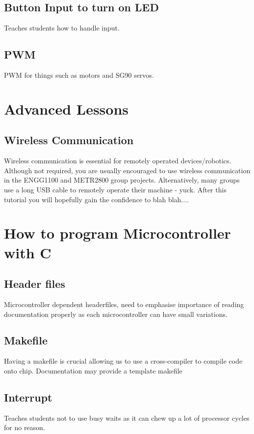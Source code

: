 \documentclass[11pt]{article}
\begin{document}
\subsection*{Button Input to turn on LED}
Teaches students how to handle input.
\subsection*{PWM}
PWM for things such as motors and SG90 servos.


\section*{Advanced Lessons}

\subsection*{Wireless Communication}
Wireless communication is essential for remotely operated devices/robotics. 
Although not required, you are usually encouraged to use wireless 
communication in the ENGG1100 and METR2800 group projects.
Alternatively, many groups use a long USB cable to remotely operate their 
machine - yuck. After this tutorial you will hopefully gain the confidence to blah blah....

\section*{How to program Microcontroller with C}
\subsection*{Header files}
Microcontroller dependent headerfiles, need to emphasise importance of reading documentation properly
as each microcontroller can have small variations.
\subsection*{Makefile}
Having a makefile is crucial allowing us to use a cross-compiler to compile code onto chip.
Documentation may provide a template makefile

\subsection*{Interrupt}
Teaches students not to use busy waits as it can chew up a lot of processor cycles for no reason.
\end{document}

